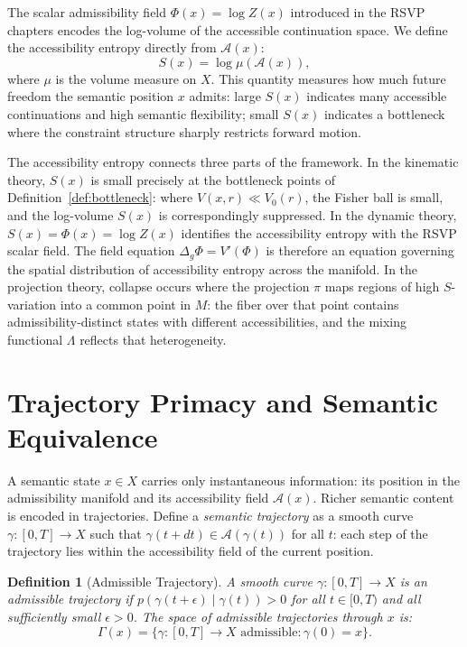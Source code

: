 \documentclass[12pt, oneside]{book}
\theoremstyle{plain-flyxion}
\theoremstyle{definition-flyxion}
\newtheorem{definition}[theorem]{Definition}
\newcommand{\A}{\mathcal{A}}
\newcommand{\Lam}{\Lambda}
\begin{document}
The scalar admissibility field $\Phi(x) = \log Z(x)$ introduced in the RSVP chapters
encodes the log-volume of the accessible continuation space. We define the accessibility
entropy directly from $\A(x)$:
\begin{equation}\label{eq:access-entropy}
S(x) = \log \mu(\A(x)),
\end{equation}
where $\mu$ is the volume measure on $X$. This quantity measures how much future freedom
the semantic position $x$ admits: large $S(x)$ indicates many accessible continuations
and high semantic flexibility; small $S(x)$ indicates a bottleneck where the constraint
structure sharply restricts forward motion.

The accessibility entropy connects three parts of the framework. In the kinematic theory,
$S(x)$ is small precisely at the bottleneck points of Definition~\ref{def:bottleneck}:
where $V(x,r) \ll V_0(r)$, the Fisher ball is small, and the log-volume $S(x)$ is
correspondingly suppressed. In the dynamic theory, $S(x) = \Phi(x) = \log Z(x)$
identifies the accessibility entropy with the RSVP scalar field. The field equation
$\Delta_g \Phi = V'(\Phi)$ is therefore an equation governing the spatial distribution
of accessibility entropy across the manifold. In the projection theory, collapse occurs
where the projection $\pi$ maps regions of high $S$-variation into a common point in
$M$: the fiber over that point contains admissibility-distinct states with different
accessibilities, and the mixing functional $\Lam$ reflects that heterogeneity.

\section{Trajectory Primacy and Semantic Equivalence}

A semantic state $x \in X$ carries only instantaneous information: its position in the
admissibility manifold and its accessibility field $\A(x)$. Richer semantic content is
encoded in trajectories. Define a \emph{semantic trajectory} as a smooth curve $\gamma:
[0,T] \to X$ such that $\gamma(t+dt) \in \A(\gamma(t))$ for all $t$: each step of the
trajectory lies within the accessibility field of the current position.

\begin{definition}[Admissible Trajectory]\label{def:admissible-traj}
A smooth curve $\gamma: [0,T] \to X$ is an \emph{admissible trajectory} if
$p(\gamma(t+\epsilon) \mid \gamma(t)) > 0$ for all $t \in [0,T)$ and all sufficiently
small $\epsilon > 0$. The space of admissible trajectories through $x$ is:
\[
\Gamma(x) = \{\gamma: [0,T] \to X \text{ admissible} : \gamma(0) = x\}.
\]
\end{definition}
\end{document}
